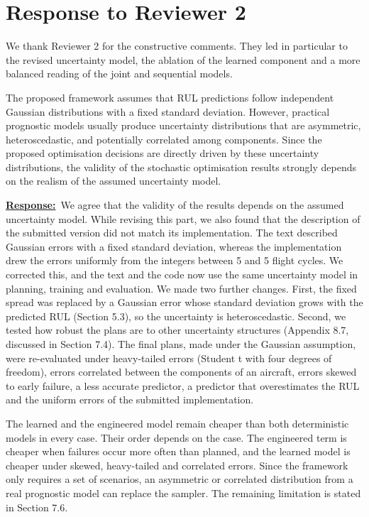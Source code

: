 \documentclass{article}
\newcommand{\response}{\vspace{0.1cm}\noindent\underline{\textbf{Response:}}\ }
\begin{document}
\newpage
\section{Response to Reviewer 2}

We thank Reviewer 2 for the constructive comments. They led in particular to the revised uncertainty model, the ablation of the learned component and a more balanced reading of the joint and sequential models.

\begin{cmt}{}{}
The proposed framework assumes that RUL predictions follow independent Gaussian distributions with a fixed standard deviation. However, practical prognostic models usually produce uncertainty distributions that are asymmetric, heteroscedastic, and potentially correlated among components. Since the proposed optimisation decisions are directly driven by these uncertainty distributions, the validity of the stochastic optimisation results strongly depends on the realism of the assumed uncertainty model.
\end{cmt}

\response We agree that the validity of the results depends on the assumed uncertainty model. While revising this part, we also found that the description of the submitted version did not match its implementation. The text described Gaussian errors with a fixed standard deviation, whereas the implementation drew the errors uniformly from the integers between \textminus{}5 and 5 flight cycles. We corrected this, and the text and the code now use the same uncertainty model in planning, training and evaluation. We made two further changes. First, the fixed spread was replaced by a Gaussian error whose standard deviation grows with the predicted RUL (Section 5.3), so the uncertainty is heteroscedastic. Second, we tested how robust the plans are to other uncertainty structures (Appendix 8.7, discussed in Section 7.4). The final plans, made under the Gaussian assumption, were re-evaluated under heavy-tailed errors (Student t with four degrees of freedom), errors correlated between the components of an aircraft, errors skewed to early failure, a less accurate predictor, a predictor that overestimates the RUL and the uniform errors of the submitted implementation.

The learned and the engineered model remain cheaper than both deterministic models in every case. Their order depends on the case. The engineered term is cheaper when failures occur more often than planned, and the learned model is cheaper under skewed, heavy-tailed and correlated errors. Since the framework only requires a set of scenarios, an asymmetric or correlated distribution from a real prognostic model can replace the sampler. The remaining limitation is stated in Section 7.6.
\end{document}
